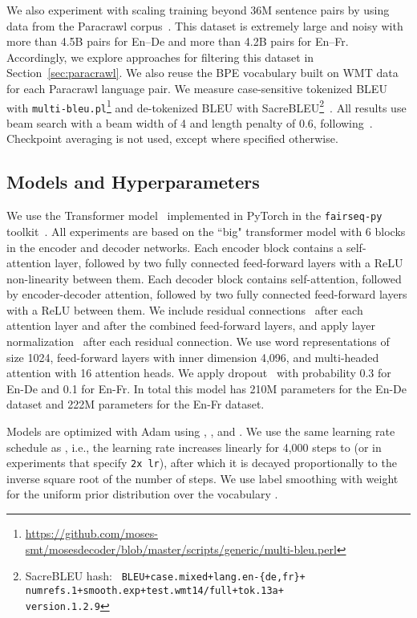 \documentclass[11pt,a4paper]{article}
\begin{document}
We also experiment with scaling training beyond 36M sentence pairs by using data from the Paracrawl corpus~\cite{paracrawl}.
This dataset is extremely large and noisy with more than 4.5B pairs for En--De and more than 4.2B pairs for En--Fr.
Accordingly, we explore approaches for filtering this dataset in Section~\ref{sec:paracrawl}.
We also reuse the BPE vocabulary built on WMT data for each Paracrawl language pair.
We measure case-sensitive tokenized BLEU with \texttt{multi-bleu.pl}\footnote{\url{https://github.com/moses-smt/mosesdecoder/blob/master/scripts/generic/multi-bleu.perl}} and de-tokenized BLEU with SacreBLEU\footnote{SacreBLEU hash: \texttt{\scriptsize
\mbox{BLEU+case.mixed+lang.en-\{de,fr\}+}\\
\mbox{numrefs.1+smooth.exp+test.wmt14/full+tok.13a+}\\
\mbox{version.1.2.9}}}~\citep{post2018sacrebleu}.
All results use beam search with a beam width of 4 and length penalty of 0.6, following~\citealt{vaswani2017transformer}.
Checkpoint averaging is not used, except where specified otherwise.

\subsection{Models and Hyperparameters}

We use the Transformer model~\citep{vaswani2017transformer} implemented in PyTorch in the \texttt{fairseq-py} toolkit~\citep{fairseq}.
All experiments are based on the ``big" transformer model with 6 blocks in the encoder and decoder networks.
Each encoder block contains a self-attention layer, followed by two fully connected feed-forward layers with a ReLU non-linearity between them.
Each decoder block contains self-attention, followed by encoder-decoder attention, followed by two fully connected feed-forward layers with a ReLU between them.
We include residual connections~\cite{he2015deep} after each attention layer and after the combined feed-forward layers,
and apply layer normalization~\cite{ba2016layer} after each residual connection.
We use word representations of size 1024,
feed-forward layers with inner dimension 4,096,
and multi-headed attention with 16 attention heads.
We apply dropout~\cite{srivastava2014dropout} with probability 0.3 for En-De and 0.1 for En-Fr.
In total this model has 210M parameters for the En-De dataset and 222M parameters for the En-Fr dataset.

Models are optimized with Adam \citep{kingma2015adam} using , , and .
We use the same learning rate schedule as \citet{vaswani2017transformer}, i.e., the learning rate increases linearly for 4,000 steps to  (or  in experiments that specify \texttt{2x lr}),
after which it is decayed proportionally to the inverse square root of the number of steps.
We use label smoothing with  weight for the uniform prior distribution over the vocabulary  \citep{szegedy2015inception,pereyra2017regularize}. 
\end{document}
